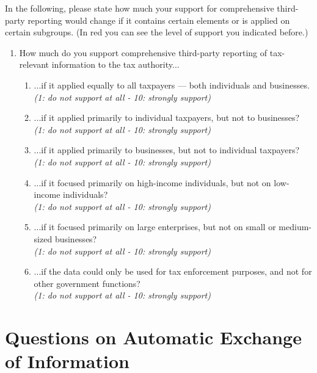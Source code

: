 \documentclass[11pt]{article}
\begin{document}
\noindent In the following, please state how much your support for comprehensive third-party reporting would change if it contains certain elements or is applied on certain subgroups. (In red you can see the level of support you indicated before.) \\  
\begin{enumerate}[resume]
    \item How much do you support comprehensive third-party reporting of tax-relevant information to the tax authority... 

\begin{enumerate}[label=\alph*)]
    \item ...if it applied equally to all taxpayers — both individuals and businesses.\\
    \textit{(1: do not support at all - 10: strongly support)}
    \item ...if it applied primarily to individual taxpayers, but not to businesses?\\
    \textit{(1: do not support at all - 10: strongly support)}
    \item ...if it applied primarily to businesses, but not to individual taxpayers?\\
    \textit{(1: do not support at all - 10: strongly support)}
    \item ...if it focused primarily on high-income individuals, but not on low-income individuals?\\
    \textit{(1: do not support at all - 10: strongly support)}
    \item ...if it focused primarily on large enterprises, but not on small or medium-sized businesses?\\
    \textit{(1: do not support at all - 10: strongly support)}
    \item ...if the data could only be used for tax enforcement purposes, and not for other government functions?\\
    \textit{(1: do not support at all - 10: strongly support)}
    \end{enumerate}
\end{enumerate}    




\section*{Questions on Automatic Exchange of Information}
\end{document}

